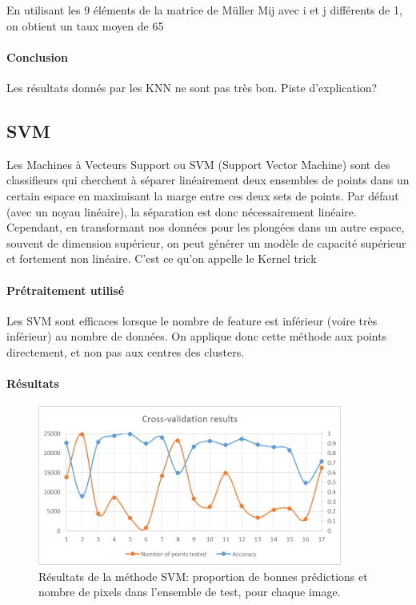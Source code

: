 \documentclass[a4paper,10pt]{report}
\begin{document}
En utilisant les 9 éléments de la matrice de Müller Mij avec i et j différents de 1, on obtient un taux moyen de 65%
\paragraph{Conclusion}
Les résultats donnés par les KNN ne sont pas très bon. Piste d'explication?

\subsection{SVM}
Les Machines à Vecteurs Support ou SVM (Support Vector Machine) sont des classifieurs qui cherchent à séparer linéairement deux ensembles de points dans un certain espace en maximisant la marge entre ces deux sets de points. Par défaut (avec un noyau linéaire), la séparation est donc nécessairement linéaire. Cependant, en transformant nos données pour les plongées dans un autre espace, souvent de dimension supérieur, on peut générer un modèle de capacité supérieur et fortement non linéaire. C'est ce qu'on appelle le Kernel trick

\paragraph{Prétraitement utilisé}
Les SVM sont efficaces lorsque le nombre de feature est inférieur (voire très inférieur) au nombre de données. On applique donc cette méthode aux points directement, et non pas aux centres des clusters.

\paragraph{Résultats}

\begin{figure}[H]
  \centering  
  \caption{Résultats de la méthode SVM: proportion de bonnes prédictions et nombre de pixels dans l'ensemble de test, pour chaque image.}
  \includegraphics[width=10cm]{SVM_CV.png}
\end{figure}
\end{document}
